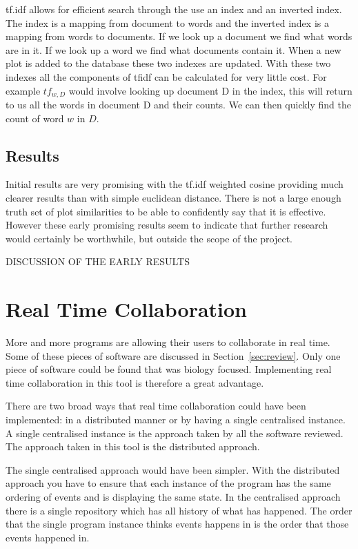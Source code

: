 
\ac{tf.idf} allows for efficient search through the use an index and an inverted index.  The index is a mapping from document to words and the inverted index is a mapping from words to documents.  If we look up a document we find what words are in it.  If we look up a word we find what documents contain it.  When a new plot is added to the database these two indexes are updated.  With these two indexes all the components of \ac{tfidf} can be calculated for very little cost.  For example $tf_{w,D}$ would involve looking up document D in the index, this will return to us all the words in document D and their counts.  We can then quickly find the count of word $w$ in $D$.

\subsection{Results}
Initial results are very promising with the tf.idf weighted cosine providing much clearer results than with simple euclidean distance.  There is not a large enough truth set of plot similarities to be able to confidently say that it is effective.  However these early promising results seem to indicate that further research would certainly be worthwhile, but outside the scope of the project.

DISCUSSION OF THE EARLY RESULTS

\section{Real Time Collaboration}

More and more programs are allowing their users to collaborate in real time.  Some of these pieces of software are discussed in Section~\ref{sec:review}.  Only one piece of software could be found that was biology focused.  Implementing real time collaboration in this tool is therefore a great advantage.

There are two broad ways that real time collaboration could have been implemented: in a distributed manner or by having a single centralised instance.  A single centralised instance is the approach taken by all the software reviewed.  The approach taken in this tool is the distributed approach.

The single centralised approach would have been simpler.  With the distributed approach you have to ensure that each instance of the program has the same ordering of events and is displaying the same state.  In the centralised approach there is a single repository which has all history of what has happened.  The order that the single program instance thinks events happens in is the order that those events happened in.

